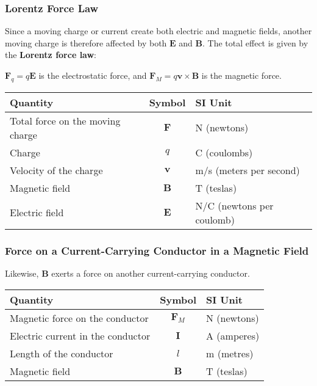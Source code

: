\documentclass[12pt,aspectratio=169]{beamer}
\newcommand{\mb}[1]{\mathbf{#1}}
\newcommand{\eq}[2]{\vspace{#1}{\Large\begin{displaymath}#2\end{displaymath}}}
\begin{document}
\begin{frame}
  \frametitle{Lorentz Force Law}
  Since a moving charge or current create both electric and magnetic fields,
  another moving charge is therefore affected by both $\mb{E}$ and $\mb{B}$.
  The total effect is given by the \textbf{Lorentz force law}:

  \eq{-.2in}{
    \boxed{\mb{F}=q(\mb{E}+\mb{v}\times\mb{B})}
  }

  \vspace{-.1in}$\mb{F}_q=q\mb{E}$ is the electrostatic force, and
  $\mb{F}_M=q\mb{v}\times\mb{B}$ is the magnetic force.

  \vspace{-.15in}
  \begin{center}
    \begin{tabular}{l|c|l}
      \rowcolor{pink}
      \textbf{Quantity} & \textbf{Symbol} & \textbf{SI Unit} \\ \hline
      Total force on the moving charge & $\mb{F}$ & \si{N} (newtons) \\
      Charge                 & $q$      & \si{C}   (coulombs) \\
      Velocity of the charge & $\mb{v}$ & \si{m/s} (meters per second)\\
      Magnetic field         & $\mb{B}$ & \si{T}   (teslas) \\
      Electric field         & $\mb{E}$ & \si{N/C} (newtons per coulomb)
    \end{tabular}
  \end{center}

\end{frame}


\begin{frame}
  \frametitle{Force on a Current-Carrying Conductor in a Magnetic Field}

  Likewise, $\mb{B}$ exerts a force on another current-carrying conductor.

  \eq{-.2in}{
    \boxed{F_M=\mb{I}l\times\mb{B}}
  }
  
  \vspace{-.1in}
  \begin{center}
    \begin{tabular}{l|c|l}
      \rowcolor{pink}
      \textbf{Quantity} & \textbf{Symbol} & \textbf{SI Unit} \\ \hline
      Magnetic force on the conductor   & $\mb{F}_M$ & \si{N} (newtons) \\
      Electric current in the conductor & $\mb{I}$   & \si{A} (amperes) \\
      Length of the conductor           & $l$        & \si{m} (metres)\\
      Magnetic field                    & $\mb{B}$   & \si{T} (teslas)
    \end{tabular}
  \end{center}
\end{frame}
\end{document}
